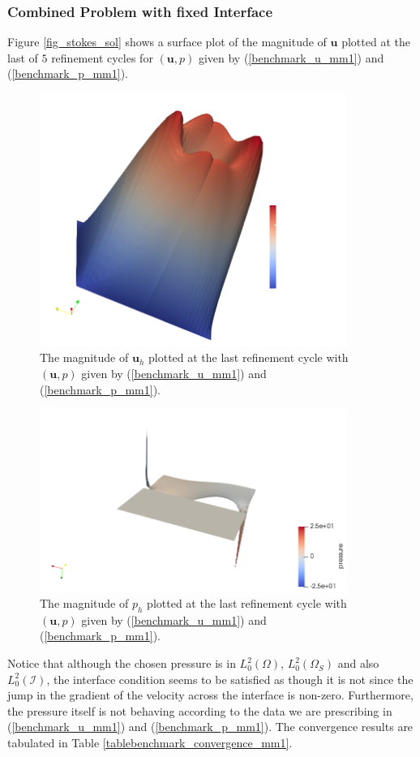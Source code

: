\documentclass[12pt,a4paper]{article}
\theoremstyle{definition}
\begin{document}
\subsubsection{Combined Problem with fixed Interface}
Figure \ref{fig_stokes_sol}  shows a surface plot of the magnitude of $\textbf{u}$ plotted at the last of $5$ refinement cycles for $\left(\textbf{u}, p\right)$ given by (\ref{benchmark_u_mm1}) and (\ref{benchmark_p_mm1}).
\begin{figure}[H]
	\centering
	\includegraphics[width=10cm]{combi_u}
	\caption{The magnitude of $\textbf{u}_h$ plotted at the last refinement cycle with $\left(\textbf{u},p\right)$ given by (\ref{benchmark_u_mm1}) and (\ref{benchmark_p_mm1}).}
	\label{fig_combi_sol}
\end{figure}
\begin{figure}[H]
	\centering
	\includegraphics[width=10cm]{combi_p}
	\caption{The magnitude of $p_h$ plotted at the last refinement cycle with $\left(\textbf{u},p\right)$ given by (\ref{benchmark_u_mm1}) and (\ref{benchmark_p_mm1}).}
	\label{fig_combi_sol_p}
\end{figure}
Notice that although the chosen pressure is in  $L^2_0\left(\Omega\right)$, $L^2_0\left(\Omega_S\right)$ and also $L^2_0\left(\mathcal{I}\right)$, the interface condition seems to be satisfied as though it is not since the jump in the gradient of the velocity across the interface is non-zero. Furthermore, the pressure itself is not behaving according to the data we are prescribing in  (\ref{benchmark_u_mm1}) and (\ref{benchmark_p_mm1}).  The convergence results are tabulated in Table \ref{tablebenchmark_convergence_mm1}.  
\end{document}
